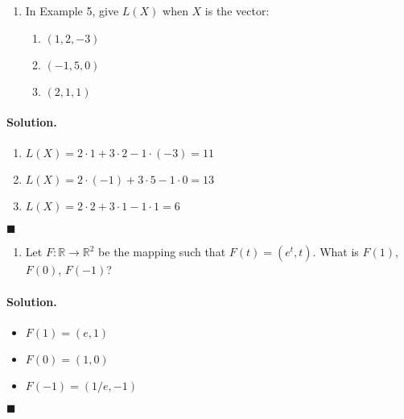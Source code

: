 \documentclass[12pt]{article}
\newenvironment{exercise}[1]
  {\begin{enumerate}[left=0pt] \item[\textbf{#1.}]}
  {\end{enumerate}}
\newenvironment{solution}{\paragraph{Solution.}}{\hfill$\blacksquare$}
\newcommand{\R}{\mathbb{R}}
\begin{document}
\begin{exercise}{3}
  In Example 5, give $L(X)$ when $X$ is the vector:

  \begin{enumerate}[label=(\alph*), noitemsep]
    \item $(1, 2, -3)$
    \item $(-1, 5, 0)$
    \item $(2, 1, 1)$
  \end{enumerate}
\end{exercise}

\begin{solution}
  \begin{enumerate}[label=(\alph*), noitemsep]
    \item $L(X) = 2 \cdot 1 + 3 \cdot 2 - 1 \cdot (-3) = 11$
    \item $L(X) = 2 \cdot (-1) + 3 \cdot 5 - 1 \cdot 0 = 13$
    \item $L(X) = 2 \cdot 2 + 3 \cdot 1 - 1 \cdot 1 = 6$
  \end{enumerate}
\end{solution}

\begin{exercise}{4}
  Let $F : \R \to \R^2$ be the mapping such that $F(t) = (e^t, t)$. What is
  $F(1)$, $F(0)$, $F(-1)$?
\end{exercise}

\begin{solution}
  \begin{itemize}[noitemsep]
    \item $F(1) = (e, 1)$
    \item $F(0) = (1, 0)$
    \item $F(-1) = (1/e, -1)$
  \end{itemize}
\end{solution}
\end{document}
